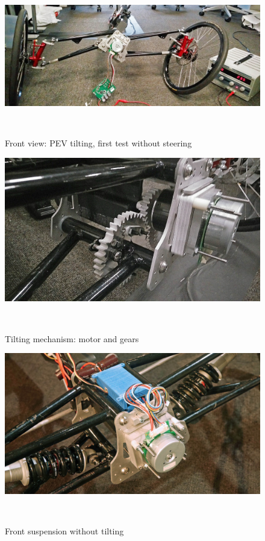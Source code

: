 \begin{figure}[h!]
	\includegraphics[width=0.95\linewidth]{figs/05/IMG_20161231_124120}
	\caption{Front view: PEV tilting, first test without steering}
	\\[-0.5cm]
\end{figure}
\begin{figure}[h!]
	\includegraphics[width=0.95\linewidth]{figs/05/IMG_20161230_212159}
	\caption{Tilting mechanism: motor and gears}
	\\[-0.5cm]
\end{figure}
\begin{figure}[h!]
	\includegraphics[width=0.95\linewidth]{figs/05/P1050722}
	\caption{Front suspension without tilting}
	\label{P1050722}
	\\[-0.5cm]
\end{figure}
